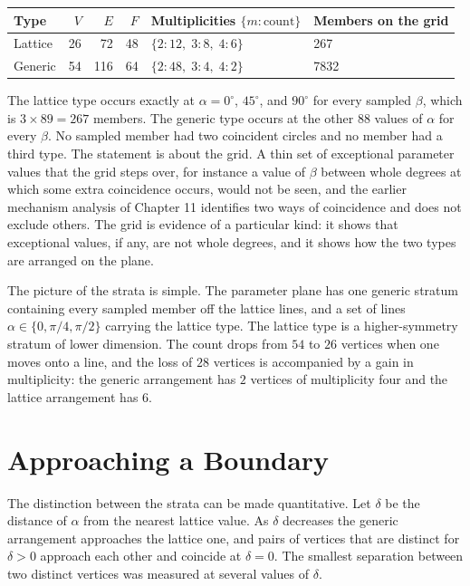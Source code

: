 \begin{center}
\begin{tabular}{lrrrll}
\toprule
Type & $V$ & $E$ & $F$ & Multiplicities $\{m:\text{count}\}$ & Members on the grid\\
\midrule
Lattice & 26 & 72 & 48 & $\{2:12,\;3:8,\;4:6\}$ & 267\\
Generic & 54 & 116 & 64 & $\{2:48,\;3:4,\;4:2\}$ & 7832\\
\bottomrule
\end{tabular}
\end{center}

The lattice type occurs exactly at $\alpha=0^\circ$, $45^\circ$, and $90^\circ$ for every sampled $\beta$, which is $3\times89=267$ members. The generic type occurs at the other $88$ values of $\alpha$ for every $\beta$. No sampled member had two coincident circles and no member had a third type. The statement is about the grid. A thin set of exceptional parameter values that the grid steps over, for instance a value of $\beta$ between whole degrees at which some extra coincidence occurs, would not be seen, and the earlier mechanism analysis of Chapter 11 identifies two ways of coincidence and does not exclude others. The grid is evidence of a particular kind: it shows that exceptional values, if any, are not whole degrees, and it shows how the two types are arranged on the plane.

The picture of the strata is simple. The parameter plane has one generic stratum containing every sampled member off the lattice lines, and a set of lines $\alpha\in\{0,\pi/4,\pi/2\}$ carrying the lattice type. The lattice type is a higher-symmetry stratum of lower dimension. The count drops from $54$ to $26$ vertices when one moves onto a line, and the loss of $28$ vertices is accompanied by a gain in multiplicity: the generic arrangement has $2$ vertices of multiplicity four and the lattice arrangement has $6$.

\section{Approaching a Boundary}

The distinction between the strata can be made quantitative. Let $\delta$ be the distance of $\alpha$ from the nearest lattice value. As $\delta$ decreases the generic arrangement approaches the lattice one, and pairs of vertices that are distinct for $\delta>0$ approach each other and coincide at $\delta=0$. The smallest separation between two distinct vertices was measured at several values of $\delta$.

